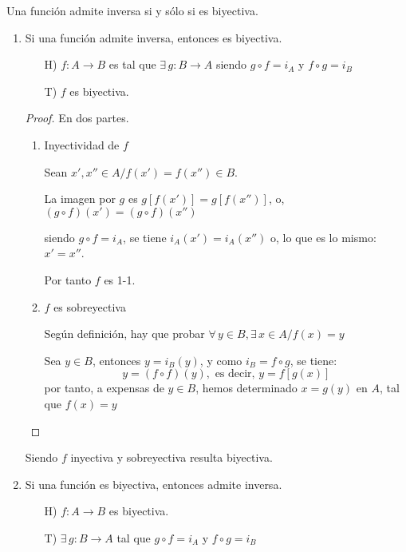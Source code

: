 \begin{fmd-theorem}
	Una función admite inversa si y sólo si es biyectiva.
\end{fmd-theorem}

\begin{enumerate}
	\item Si una función admite inversa, entonces es biyectiva.
	\begin{itemize}
		\item[H)] $f: A\rightarrow B$ es tal que $\exists \, g: B \rightarrow A$
		siendo $g \circ f = i_A$ y $f \circ g = i_B$
		\item[T)] $f$ es biyectiva.
	\end{itemize}
	\begin{proof}
		En dos partes.
		\begin{enumerate}[label=\alph*)]
			\item Inyectividad de $f$
			
			Sean $x', x'' \in A / f(x') = f(x'') \in B$.
			
			La imagen por $g$ es $g[f(x')] = g[f(x'')] $, o,
			$(g \circ f)(x') = (g \circ f)(x'')$
			
			siendo $g \circ f = i_A$, se tiene $i_A(x') = i_A(x'')$ o, lo que es lo mismo:
			$x' = x''$.
			
			Por tanto $f$ es 1-1.

		\item $f$ es sobreyectiva
		
		Según definición, hay que probar $\forall \, y \in B, \exists \, x \in A /
		f(x) = y$\vspace{2mm}
		
		Sea $y \in B$, entonces $y = i_B(y)$, y como $i_B = f \circ g$, se tiene:
		\[ y = (f \circ f)(y), \mbox{ es decir, } y= f[g(x)] \]
		por tanto, a expensas de $y \in B$, hemos determinado $x = g(y)$ en $A$,
		tal que $f(x) = y$
	\end{enumerate}
\end{proof}
Siendo $f$ inyectiva y sobreyectiva resulta biyectiva.


	\item Si una función es biyectiva, entonces admite inversa.
	
	\begin{itemize}
		\item[H)] $f: A \rightarrow B$ es biyectiva.
		\item[T)] $\exists \, g: B \rightarrow A$ tal que $g \circ f = i_A$ y
		$f \circ g = i_B$
	\end{itemize}
	

\end{enumerate}
